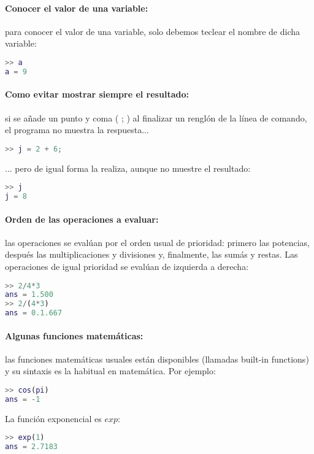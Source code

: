 \paragraph{Conocer el valor de una variable:}para conocer el valor de una variable, solo debemos teclear el nombre de dicha variable:
\begin{lstlisting}[language=Matlab]
>> a
a = 9
\end{lstlisting}

\paragraph{Como evitar mostrar siempre el resultado:}si se añade un punto y coma ( ; ) al finalizar un renglón de la línea de comando, el programa no muestra la respuesta...
\begin{lstlisting}[language=Matlab]
>> j = 2 + 6;
\end{lstlisting}

... pero de igual forma la realiza, aunque no muestre el resultado:
\begin{lstlisting}[language=Matlab]
>> j
j = 8
\end{lstlisting}

\paragraph{Orden de las operaciones a evaluar:}las operaciones se evalúan por el orden usual de prioridad: primero las potencias, después las multiplicaciones y divisiones y, finalmente, las sumás y restas. Las operaciones de igual prioridad se evalúan de izquierda a derecha:
\begin{lstlisting}[language=Matlab]
>> 2/4*3
ans = 1.500
>> 2/(4*3)
ans = 0.1.667
\end{lstlisting}

\paragraph{Algunas funciones matemáticas:}las funciones matemáticas usuales están disponibles (llamadas built-in functions) y su sintaxis es la habitual en matemática. Por ejemplo:
\begin{lstlisting}[language=Matlab]
>> cos(pi)
ans = -1
\end{lstlisting}

La función exponencial es $exp$:
\begin{lstlisting}[language=Matlab]
>> exp(1)
ans = 2.7183
\end{lstlisting}


